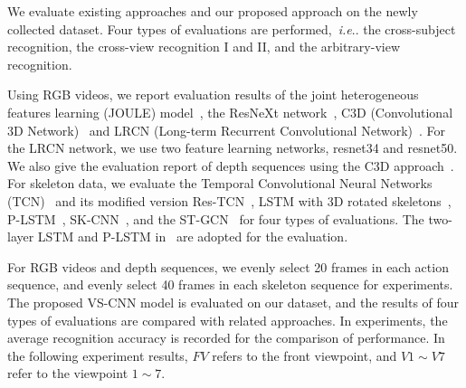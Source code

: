 \documentclass[journal]{IEEEtran}
\makeatletter
\DeclareRobustCommand\onedot{\futurelet\@let@token\@onedot}
\def\@onedot{\ifx\@let@token.\else.\null\fi\xspace}
\def\ie{\emph{i.e}\onedot} \def\Ie{\emph{I.e}\onedot}
\makeatother
\begin{document}
We evaluate existing approaches and our proposed approach on the newly collected dataset. Four types of evaluations are performed,~\ie the cross-subject recognition, the cross-view recognition I and II, and the arbitrary-view recognition.

Using RGB videos, we report evaluation results of the joint heterogeneous features learning (JOULE) model~\cite{JOULE2015,JOULE2016}, the ResNeXt network~\cite{ResNeXtARX2018}, C3D (Convolutional 3D Network)~\cite{C3DICCV2015} and LRCN (Long-term Recurrent Convolutional Network)~\cite{LRCNCVPR2015}. For the LRCN network, we use two feature learning networks, resnet34 and resnet50.
We also give the evaluation report of depth sequences using the C3D approach~\cite{C3DICCV2015}.
For skeleton data, we evaluate the Temporal Convolutional Neural Networks (TCN)~\cite{TCN2017} and its modified version Res-TCN~\cite{ResTCN2017}, LSTM with 3D rotated skeletons~\cite{ShahroudyNTU2016}, P-LSTM~\cite{ShahroudyNTU2016}, SK-CNN~\cite{EnhancedSK2017}, and the ST-GCN~\cite{STGCN2018} for four types of evaluations. The two-layer LSTM and P-LSTM in~\cite{ShahroudyNTU2016} are adopted for the evaluation.

For RGB videos and depth sequences, we evenly select 20 frames in each action sequence, and evenly select 40 frames in each skeleton sequence for experiments. The proposed VS-CNN model is evaluated on our dataset, and the results of four types of evaluations are compared with related approaches. In experiments, the average recognition accuracy is recorded for the comparison of performance. In the following experiment results, $ FV $ refers to the front viewpoint, and $V1 \sim V7$ refer to the viewpoint $1 \sim 7$.
\end{document}
